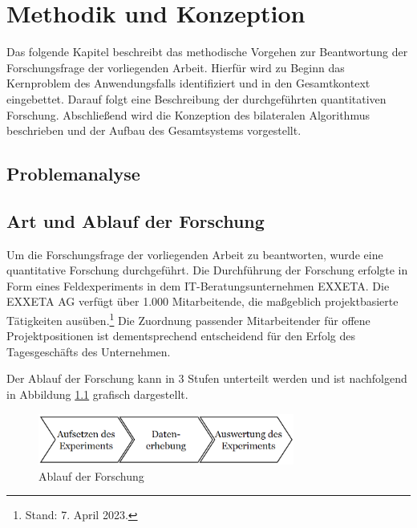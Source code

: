 
\chapter{Methodik und Konzeption}
\label{ch:methodik}
Das folgende Kapitel beschreibt das methodische Vorgehen zur Beantwortung der Forschungsfrage der vorliegenden Arbeit.
Hierfür wird zu Beginn das Kernproblem des Anwendungsfalls identifiziert und in den Gesamtkontext eingebettet.
Darauf folgt eine Beschreibung der durchgeführten quantitativen Forschung.
Abschließend wird die Konzeption des bilateralen Algorithmus beschrieben und der Aufbau des Gesamtsystems vorgestellt.

\section{Problemanalyse}


\section{Art und Ablauf der Forschung}
Um die Forschungsfrage der vorliegenden Arbeit zu beantworten, wurde eine quantitative Forschung durchgeführt.
Die Durchführung der Forschung erfolgte in Form eines Feldexperiments in dem IT-Beratungsunternehmen EXXETA.
Die EXXETA AG verfügt über 1.000 Mitarbeitende, die maßgeblich projektbasierte Tätigkeiten ausüben.\footnote{Stand: 7. April 2023.}
Die Zuordnung passender Mitarbeitender für offene Projektpositionen ist dementsprechend entscheidend für den Erfolg des Tagesgeschäfts des Unternehmen.

Der Ablauf der Forschung kann in 3 Stufen unterteilt werden und ist nachfolgend in Abbildung \ref{fig:methodik:abb1} grafisch dargestellt.

\begin{figure}[H]
    \centering
	\includegraphics[width=0.75\textwidth]{gfx/prozess-forschung.png}
	\caption[Ablauf der Forschung]{Ablauf der Forschung}
	\label{fig:methodik:abb1}
\end{figure}

